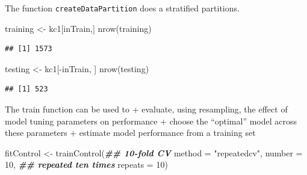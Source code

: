 \documentclass[
]{book}
\newenvironment{Shaded}{\begin{snugshade}}{\end{snugshade}}
\newcommand{\AttributeTok}[1]{\textcolor[rgb]{0.77,0.63,0.00}{#1}}
\newcommand{\ConstantTok}[1]{\textcolor[rgb]{0.00,0.00,0.00}{#1}}
\newcommand{\DecValTok}[1]{\textcolor[rgb]{0.00,0.00,0.81}{#1}}
\newcommand{\DocumentationTok}[1]{\textcolor[rgb]{0.56,0.35,0.01}{\textbf{\textit{#1}}}}
\newcommand{\FunctionTok}[1]{\textcolor[rgb]{0.00,0.00,0.00}{#1}}
\newcommand{\NormalTok}[1]{#1}
\newcommand{\OtherTok}[1]{\textcolor[rgb]{0.56,0.35,0.01}{#1}}
\newcommand{\SpecialCharTok}[1]{\textcolor[rgb]{0.00,0.00,0.00}{#1}}
\newcommand{\StringTok}[1]{\textcolor[rgb]{0.31,0.60,0.02}{#1}}
\begin{document}
\begin{Shaded}
\end{Shaded}

The function \texttt{createDataPartition} does a stratified partitions.

\begin{Shaded}
\begin{Highlighting}[]
\NormalTok{training }\OtherTok{\textless{}{-}}\NormalTok{ kc1[inTrain,]}
\FunctionTok{nrow}\NormalTok{(training)}
\end{Highlighting}
\end{Shaded}

\begin{verbatim}
## [1] 1573
\end{verbatim}

\begin{Shaded}
\begin{Highlighting}[]
\NormalTok{testing }\OtherTok{\textless{}{-}}\NormalTok{ kc1[}\SpecialCharTok{{-}}\NormalTok{inTrain, ]}
\FunctionTok{nrow}\NormalTok{(testing)}
\end{Highlighting}
\end{Shaded}

\begin{verbatim}
## [1] 523
\end{verbatim}

The train function can be used to
+ evaluate, using resampling, the effect of model tuning parameters on performance
+ choose the ``optimal'' model across these parameters
+ estimate model performance from a training set

\begin{Shaded}
\begin{Highlighting}[]
\NormalTok{fitControl }\OtherTok{\textless{}{-}} \FunctionTok{trainControl}\NormalTok{(}\DocumentationTok{\#\# 10{-}fold CV}
                           \AttributeTok{method =} \StringTok{"repeatedcv"}\NormalTok{,}
                           \AttributeTok{number =} \DecValTok{10}\NormalTok{,}
                           \DocumentationTok{\#\# repeated ten times}
                           \AttributeTok{repeats =} \DecValTok{10}\NormalTok{)}
\end{Highlighting}
\end{Shaded}
\end{document}

